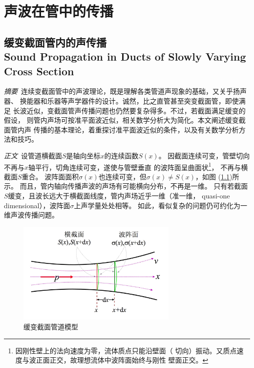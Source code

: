 \documentclass[UTF8]{ctexbook}
\begin{document}
\chapter{声波在管中的传播}

\section{缓变截面管内的声传播\\
Sound Propagation in Ducts of Slowly Varying Cross Section}

\emph{摘要}\ 
连续变截面管中的声波理论，既是理解各类管道声现象的基础，又关乎扬声器、
换能器和乐器等声学器件的设计。诚然，比之直管甚至突变截面管，即使满足
长波近似，变截面管声传播问题也仍然要复杂得多。不过，若截面满足缓变的假设，
则管内声场可按准平面波近似，相关数学分析大为简化。本文阐述缓变截面管内声
传播的基本理论，着重探讨准平面波近似的条件，以及有关数学分析方法和技巧。


\emph{正文}\
设管道横截面$S$是轴向坐标$x$的连续函数$S(x)$。
因截面连续可变，管壁切向不再与$x$轴平行，切角连续可变，遂使与管壁垂直
的波阵面呈曲面状\footnote{因刚性壁上的法向速度为零，流体质点只能沿壁面（
切向）振动。又质点速度与波正面正交，故理想流体中波阵面始终与刚性
壁面正交。}，
不再与横截面$S$重合。
波阵面面积$\sigma(x)$也连续可变，但$\sigma(x)\neq S(x)$，如图
(\ref{fig:slowvar_mod})所示。
而且，管内轴向传播声波的声场有可能横向分布，不再是一维。
只有若截面$S$缓变，且波长远大于横截面线度，管内声场近乎一维（准一维，
quasi-one dimensional），波阵面$\sigma$上声学量处处相等。
如此，看似复杂的问题仍可约化为一维声波传播问题。

\begin{figure}[h]
	\label{fig:slowvar_mod}
	\centering
	\includegraphics[width=0.7\textwidth]{img/duct/slowlyVaryingPipe.jpg}
	\caption{缓变截面管道模型}
\end{figure}
\end{document}
